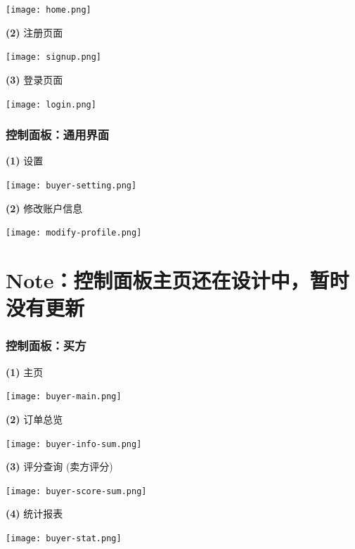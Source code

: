 \documentclass[12pt]{article}
\begin{document}
\begin{center}
	\texttt{[image: home.png]}
\end{center}

\noindent \textbf{(2)} 注册页面

\begin{center}
	\texttt{[image: signup.png]}
\end{center}

\noindent \textbf{(3)} 登录页面

\begin{center}
	\texttt{[image: login.png]}
\end{center}

\subsubsection{控制面板：通用界面}
\noindent \textbf{(1)} 设置
\begin{center}
	\texttt{[image: buyer-setting.png]}
\end{center}

\noindent \textbf{(2)} 修改账户信息
\begin{center}
	\texttt{[image: modify-profile.png]}
\end{center}

\section*{Note：控制面板主页还在设计中，暂时没有更新}

\subsubsection{控制面板：买方}
\noindent \textbf{(1)} 主页
\begin{center}
	\texttt{[image: buyer-main.png]}
\end{center}

\noindent \textbf{(2)} 订单总览
\begin{center}
	\texttt{[image: buyer-info-sum.png]}
\end{center}

\noindent \textbf{(3)} 评分查询 (卖方评分)
\begin{center}
	\texttt{[image: buyer-score-sum.png]}
\end{center}

\noindent \textbf{(4)} 统计报表
\begin{center}
	\texttt{[image: buyer-stat.png]}
\end{center}
\end{document}
